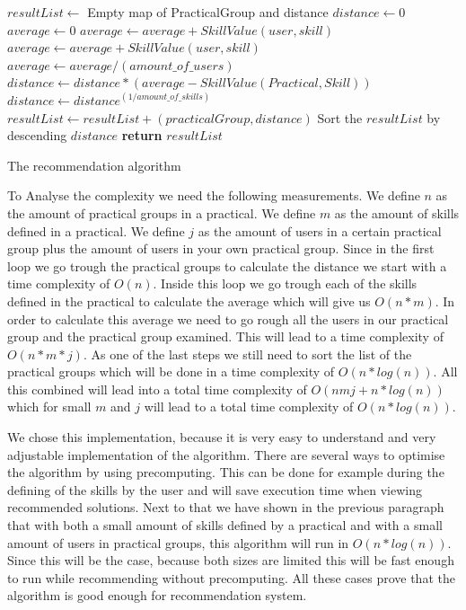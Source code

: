 \begin{algorithm}
\begin{algorithmic}
	\State $resultList\gets$ Empty map of PracticalGroup and distance
		\State $distance\gets 0$
			\State $average\gets 0$
				\State $average\gets average + SkillValue(user, skill)$
			\EndFor
				\State $average\gets average + SkillValue(user, skill)$
			\EndFor
			\State $average\gets average / (amount\_of\_users)$
			\State $distance\gets distance * (average - SkillValue(Practical, Skill))$
		\EndFor
		\State $distance\gets distance ^ {(1 / amount\_of\_skills)}$
		\State $resultList\gets resultList + (practicalGroup, distance)$
	\EndFor
	\State Sort the $resultList$ by descending $distance$
	\State \textbf{return} $resultList$
\EndFunction
\caption{The recommendation algorithm}\label{recommend}
\end{algorithmic}
\end{algorithm}

To Analyse the complexity we need the following measurements.
We define $n$ as the amount of practical groups in a practical.
We define $m$ as the amount of skills defined in a practical.
We define $j$ as the amount of users in a certain practical group plus the amount of users in your own practical group.
Since in the first loop we go trough the practical groups to calculate the distance we start with a time complexity of $O(n)$.
Inside this loop we go trough each of the skills defined in the practical to calculate the average which will give us $O(n*m)$.
In order to calculate this average we need to go rough all the users in our practical group and the practical group examined.
This will lead to a time complexity of $O(n*m*j)$.
As one of the last steps we still need to sort the list of the practical groups which will be done in a time complexity of $O(n*log(n))$.
All this combined will lead into a total time complexity of $O(nmj+n*log(n))$ which for small $m$ and $j$ will lead to a total time complexity of $O(n*log(n))$.

We chose this implementation, because it is very easy to understand and very adjustable implementation of the algorithm.
There are several ways to optimise the algorithm by using precomputing.
This can be done for example during the defining of the skills by the user and will save execution time when viewing recommended solutions.
Next to that we have shown in the previous paragraph that with both a small amount of skills defined by a practical and with a small amount of users in practical groups, this algorithm will run in $O(n*log(n))$.
Since this will be the case, because both sizes are limited this will be fast enough to run while recommending without precomputing.
All these cases prove that the algorithm is good enough for recommendation system.



